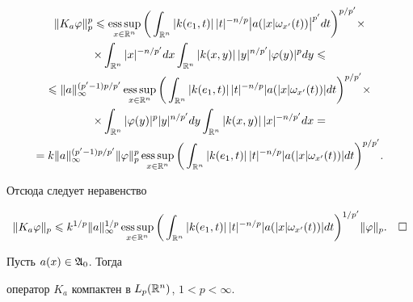 \begin{multline*}


\|K_a\varphi\|_p^p\leqslant


\esssup_{x\in\Bbb R^n}


\bigg(\int_{\Bbb R^n}|k(e_1,t)|\,|t|^{-n/p}


\big|a(|x|\omega_{x'}(t))\big|^{p'}dt\bigg)^{p/p'}\times\\


%


\times\int_{\Bbb R^n}|x|^{-n/p'}dx


\int_{\Bbb R^n}|k(x,y)|\,|y|^{n/p'}|\varphi(y)|^p dy\leqslant\\


%


\leqslant\|a\|_\infty^{(p'-1)p/p'}


\esssup_{x\in\Bbb R^n}


\bigg(\int_{\Bbb R^n}|k(e_1,t)|\,|t|^{-n/p}


|a(|x|\omega_{x'}(t))|dt\bigg)^{p/p'}\times\\


%


\times\int_{\Bbb R^n}|\varphi(y)|^p|y|^{n/p'}dy


\int_{\Bbb R^n}|k(x,y)|\,|x|^{-n/p'}dx=\\


%


=k\|a\|_\infty^{(p'-1)p/p'}


\|\varphi\|_p^p\esssup_{x\in\Bbb R^n}


\bigg(\int_{\Bbb R^n}|k(e_1,t)|\,|t|^{-n/p}


|a(|x|\omega_{x'}(t))|dt\bigg)^{p/p'}.


\end{multline*}


Отсюда следует неравенство


$$


\|K_a\varphi\|_p\leqslant k^{1/p}\|a\|_\infty^{1/p}


\esssup_{x\in\Bbb R^n}


\bigg(\int_{\Bbb R^n}|k(e_1,t)|\,|t|^{-n/p}


|a(|x|\omega_{x'}(t))|dt\bigg)^{1/p'}\|\varphi\|_p.


\quad\square


$$





\begin{thm}\label{t2.1}


Пусть $a(x)\in\frak A_0$. Тогда


оператор $K_a$ компактен в $L_p(\Bbb R^n)$, $1<p<\infty$.


\end{thm}





